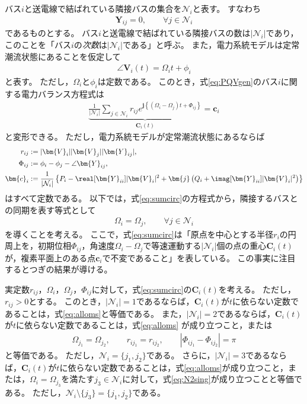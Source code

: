 \documentclass[tombow,dvipdfmx]{corona-a5}
\begin{document}
バス$i$と送電線で結ばれている隣接バスの集合を$\mathcal{N}_i$と表す。
すなわち
\begin{align*}
\bm{Y}_{ij} = 0,\qquad \forall j \in \mathcal{N}_i
\end{align*}
であるものとする。
バス$i$と送電線で結ばれている隣接バスの数は$|\mathcal{N}_i|$であり，このことを「バス$i$の\emph{次数}は$|\mathcal{N}_i|$である」と呼ぶ。
また，電力系統モデルは定常潮流状態にあることを仮定して
\begin{align*}
\angle \bm{V}_i (t) = \Omega_i t +\phi_i
\end{align*}
と表す。
ただし，$\Omega_i$と$\phi_i$は定数である。
このとき，式\ref{eq:PQVgen}のバス$i$に関する電力バランス方程式は
\begin{align}\label{eq:sumcirc}
\underbrace{
\frac{1}{|\mathcal{N}_i|}\sum_{j \in \mathcal{N}_i } 
r_{ij}
e^{\bm{j} 
\left\{
(\Omega_i - \Omega_j)t + 
\Phi_{ij}
\right\} }
}_{\bm{C}_i (t)}
= \bm{c}_i
\end{align}
と変形できる。
ただし，電力系統モデルが定常潮流状態にあるならば
\begin{align*}
r_{ij} &:=|\bm{V}_i| |\bm{V}_j| |\bm{Y}_{ij}|, 
\\
\Phi_{ij} &:= \phi_i - \phi_j - \angle \bm{Y}_{ij},
\\
\bm{c}_i &:=  \frac{1}{|\mathcal{N}_i|}
\left\{
P_i - \real[\bm{Y}_{ii}] |\bm{V}_i|^2
+ \bm{j}
\left(
Q_i + \imag [\bm{Y}_{ii}] |\bm{V}_i|^2
\right)
\right\}
\end{align*}
はすべて定数である。
以下では，式\ref{eq:sumcirc}の方程式から，隣接するバスとの同期を表す等式として
\begin{align}\label{eq:alloms}
\Omega_i = \Omega_{j} 
,\qquad 
\forall j\in \mathcal{N}_i
\end{align}
を導くことを考える。
ここで，式\ref{eq:sumcirc}は「原点を中心とする半径$r_i$の円周上を，初期位相$\Phi_{ij}$，角速度$\Omega_i-\Omega_j$で等速運動する$|\mathcal{N}_i|$個の点の重心$\bm{C}_i (t)$が，複素平面上のある点$\bm{c}_i$で不変であること」を表している。
この事実に注目するとつぎの結果が導ける。


\begin{補題}[電力バランス方程式から導かれるバスの同期]
\label{lem:sumc2}
実定数$r_{ij}$，$\Omega_i$，$\Omega_j$，$\Phi_{ij}$に対して，式\ref{eq:sumcirc}の$\bm{C}_i (t)$を考える。
ただし，$r_{ij}>0$とする。
このとき，$|\mathcal{N}_i|=1$であるならば，$\bm{C}_i (t)$が$t$に依らない定数であることは，式\ref{eq:alloms}と等価である。
また，$|\mathcal{N}_i|=2$であるならば，$\bm{C}_i (t)$が$t$に依らない定数であることは，式\ref{eq:alloms}
が成り立つこと，または
\begin{align}\label{eq:N2sing}
\Omega_{j_1} = \Omega_{j_2}
,\qquad
r_{i j_1} = r_{i j_2}
,\qquad
|\Phi_{i j_1}-\Phi_{i j_2}| = \pi
\end{align}
と等価である。
ただし，$\mathcal{N}_i = \{j_1,j_2\}$である。
さらに，$|\mathcal{N}_i|=3$であるならば，$\bm{C}_i (t)$が$t$に依らない定数であることは，式\ref{eq:alloms}が成り立つこと，または，$\Omega_{i} = \Omega_{j_3}$を満たす$j_3 \in \mathcal{N}_i$に対して，式\ref{eq:N2sing}が成り立つことと等価である。
ただし，$ \mathcal{N}_i \setminus \{j_3\}=\{j_1,j_2\}$である。
\end{補題}
\end{document}
